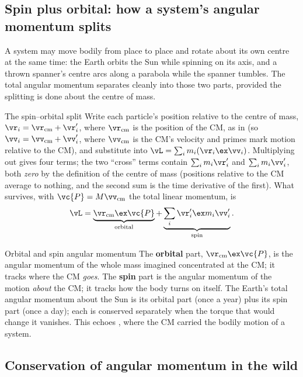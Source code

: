 \subsection{Spin plus orbital: how a system's angular momentum splits}
A system may move bodily from place to place and rotate about its own centre at the same time: the Earth
orbits the Sun while spinning on its axis, and a thrown spanner's centre arcs along a parabola while the
spanner tumbles. The total angular momentum separates cleanly into those two parts, provided the
splitting is done about the centre of mass.

\begin{derivbox}{The spin--orbital split}
Write each particle's position relative to the centre of mass, $\vr_i=\vr_{\text{cm}}+\vr_i'$, where
$\vr_{\text{cm}}$ is the position of the CM, as in  (so
$\vv_i=\vv_{\text{cm}}+\vv_i'$, where $\vv_{\text{cm}}$ is the CM's velocity and primes mark motion relative to the CM), and substitute into $\vL=\sum_i m_i(\vr_i\ex\vv_i)$. Multiplying out
gives four terms; the two ``cross'' terms contain $\sum_i m_i\vr_i'$ and $\sum_i m_i\vv_i'$, both \emph{zero}
by the definition of the centre of mass (positions relative to the CM average to nothing, and the
second sum is the time derivative of the first). What survives, with $\vc{P}=M\vv_{\text{cm}}$ the total linear momentum, is
\[
\vL=\underbrace{\vr_{\text{cm}}\ex\vc{P}}_{\text{orbital}}
+\underbrace{\sum_i \vr_i'\ex m_i\vv_i'}_{\text{spin}}.
\]
\end{derivbox}

\begin{keybox}{Orbital and spin angular momentum}
The \textbf{orbital} part, $\vr_{\text{cm}}\ex\vc{P}$, is the angular momentum of the whole mass
imagined concentrated at the CM; it tracks where the CM \emph{goes}. The \textbf{spin} part is the
angular momentum of the motion \emph{about} the CM; it tracks how the body turns on itself. The Earth's
total angular momentum about the Sun is its orbital part (once a year) plus its spin part (once a day);
each is conserved separately when the torque that would change it vanishes. This echoes , where the CM carried the bodily motion of a system.
\end{keybox}

\subsection{Conservation of angular momentum in the wild}


